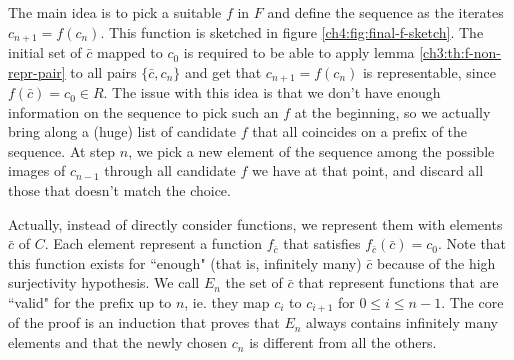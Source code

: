\begin{figure*}[ht]
	\centering
	\caption{Graphical representation of the ``final" $f$}
	\label{ch4:fig:final-f-sketch}
\end{figure*}

The main idea is to pick a suitable $f$ in $F$ and define the sequence as the iterates $c_{n+1} = f(c_n)$. This function is sketched in figure \ref{ch4:fig:final-f-sketch}. The initial set of $\bar{c}$ mapped to $c_0$ is required to be able to apply lemma \ref{ch3:th:f-non-repr-pair} to all pairs $\{ \bar{c}, c_n \}$ and get that $c_{n+1} = f(c_n)$ is representable, since $f(\bar{c}) = c_0 \in R$.
The issue with this idea is that we don't have enough information on the sequence to pick such an $f$ at the beginning, so we actually bring along a (huge) list of candidate $f$ that all coincides on a prefix of the sequence. At step $n$, we pick a new element of the sequence among the possible images of $c_{n-1}$ through all candidate $f$ we have at that point, and discard all those that doesn't match the choice.

Actually, instead of directly consider functions, we represent them with elements $\bar{c}$ of $C$. Each element represent a function $f_{\bar{c}}$ that satisfies $f_{\bar{c}}(\bar{c}) = c_0$. Note that this function exists for ``enough" (that is, infinitely many) $\bar{c}$ because of the high surjectivity hypothesis. We call $E_n$ the set of $\bar{c}$ that represent functions that are ``valid" for the prefix up to $n$, ie. they map $c_{i}$ to $c_{i+1}$ for $0 \le i \le n - 1$. The core of the proof is an induction that proves that $E_n$ always contains infinitely many elements and that the newly chosen $c_n$ is different from all the others.


